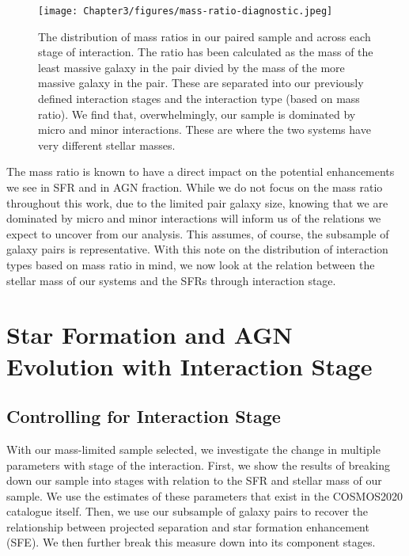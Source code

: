 \begin{figure}
\centering
\texttt{[image: Chapter3/figures/mass-ratio-diagnostic.jpeg]}
\caption[The distribution of mass ratios in our paired sample and across each stage of interaction.]{The distribution of mass ratios in our paired sample and across each stage of interaction. The ratio has been calculated as the mass of the least massive galaxy in the pair divied by the mass of the more massive galaxy in the pair. These are separated into our previously defined interaction stages and the interaction type (based on mass ratio). We find that, overwhelmingly, our sample is dominated by micro and minor interactions. These are where the two systems have very different stellar masses.}
\label{fig:mass-ratio}
\end{figure}

The mass ratio is known to have a direct impact on the potential enhancements we see in SFR and in AGN fraction. While we do not focus on the mass ratio throughout this work, due to the limited pair galaxy size, knowing that we are dominated by micro and minor interactions will inform us of the relations we expect to uncover from our analysis. This assumes, of course, the subsample of galaxy pairs is representative. With this note on the distribution of interaction types based on mass ratio in mind, we now look at the relation between the stellar mass of our systems and the SFRs through interaction stage.

\section{Star Formation and AGN Evolution with Interaction Stage}\label{results:SF_stage}
\subsection{Controlling for Interaction Stage}\label{results:int_stage}
\noindent With our mass-limited sample selected, we investigate the change in multiple parameters with stage of the interaction. First, we show the results of breaking down our sample into stages with relation to the SFR and stellar mass of our sample. We use the estimates of these parameters that exist in the COSMOS2020 catalogue itself. Then, we use our subsample of galaxy pairs to recover the relationship between projected separation and star formation enhancement (SFE). We then further break this measure down into its component stages.

